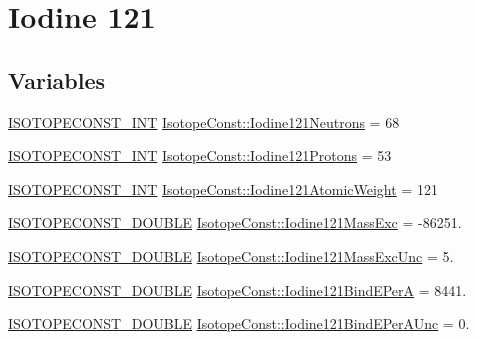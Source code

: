 \hypertarget{group___isotope_const-_iodine-_i121}{}\section{Iodine 121}
\label{group___isotope_const-_iodine-_i121}
\subsection*{Variables}
\begin{DoxyCompactItemize}
\item 
\mbox{\hyperlink{group___isotope_const-_macros_ga5f18360b3e99483a35c32d789e62621c}{I\+S\+O\+T\+O\+P\+E\+C\+O\+N\+S\+T\+\_\+\+I\+NT}} \mbox{\hyperlink{group___isotope_const-_iodine-_i121_ga893742ce9ba735a7a9d3254a499a251d}{Isotope\+Const\+::\+Iodine121\+Neutrons}} = 68
\item 
\mbox{\hyperlink{group___isotope_const-_macros_ga5f18360b3e99483a35c32d789e62621c}{I\+S\+O\+T\+O\+P\+E\+C\+O\+N\+S\+T\+\_\+\+I\+NT}} \mbox{\hyperlink{group___isotope_const-_iodine-_i121_gaf51f44bb44ac489b409682deaeb7bb1a}{Isotope\+Const\+::\+Iodine121\+Protons}} = 53
\item 
\mbox{\hyperlink{group___isotope_const-_macros_ga5f18360b3e99483a35c32d789e62621c}{I\+S\+O\+T\+O\+P\+E\+C\+O\+N\+S\+T\+\_\+\+I\+NT}} \mbox{\hyperlink{group___isotope_const-_iodine-_i121_gac9f121096422df8cede40f532d7f5757}{Isotope\+Const\+::\+Iodine121\+Atomic\+Weight}} = 121
\item 
\mbox{\hyperlink{group___isotope_const-_macros_ga8f45a7272ce02c0b4c65c44636ed719a}{I\+S\+O\+T\+O\+P\+E\+C\+O\+N\+S\+T\+\_\+\+D\+O\+U\+B\+LE}} \mbox{\hyperlink{group___isotope_const-_iodine-_i121_ga25ad1f686ae93182d540db547f14e554}{Isotope\+Const\+::\+Iodine121\+Mass\+Exc}} = -\/86251.
\item 
\mbox{\hyperlink{group___isotope_const-_macros_ga8f45a7272ce02c0b4c65c44636ed719a}{I\+S\+O\+T\+O\+P\+E\+C\+O\+N\+S\+T\+\_\+\+D\+O\+U\+B\+LE}} \mbox{\hyperlink{group___isotope_const-_iodine-_i121_ga8566aa015c7ade5305faa4a9c727ad09}{Isotope\+Const\+::\+Iodine121\+Mass\+Exc\+Unc}} = 5.
\item 
\mbox{\hyperlink{group___isotope_const-_macros_ga8f45a7272ce02c0b4c65c44636ed719a}{I\+S\+O\+T\+O\+P\+E\+C\+O\+N\+S\+T\+\_\+\+D\+O\+U\+B\+LE}} \mbox{\hyperlink{group___isotope_const-_iodine-_i121_ga26b4c3e53ec6a9d7c84068f998a21f9e}{Isotope\+Const\+::\+Iodine121\+Bind\+E\+PerA}} = 8441.
\item 
\mbox{\hyperlink{group___isotope_const-_macros_ga8f45a7272ce02c0b4c65c44636ed719a}{I\+S\+O\+T\+O\+P\+E\+C\+O\+N\+S\+T\+\_\+\+D\+O\+U\+B\+LE}} \mbox{\hyperlink{group___isotope_const-_iodine-_i121_gad925239fb19be2be569cbd036812556a}{Isotope\+Const\+::\+Iodine121\+Bind\+E\+Per\+A\+Unc}} = 0.

\end{DoxyCompactItemize}
